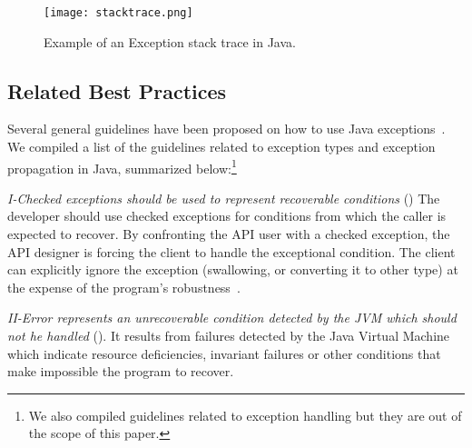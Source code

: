 \documentclass[conference]{IEEEtran}
\begin{document}
\begin{figure} \centering \texttt{[image: stacktrace.png]}
\caption{Example of an Exception stack trace in Java.}
\label{fig:wrapping}
\end{figure}



\subsection{Related Best Practices}
\label{sec:best}

Several general guidelines have been proposed on how to use Java
exceptions~\cite{mandrioli1992advances,gosling2000java,wirfs2006toward,
bloch2008effective}. 
We compiled a list of the guidelines related to exception types and exception propagation in Java, summarized below:\footnote{We also compiled guidelines related
to exception handling but they are out of the scope of this paper.}


\emph{I-Checked exceptions should be used to represent recoverable
conditions} (\cite{mandrioli1992advances,gosling2000java,wirfs2006toward,bloch2008effective})
The developer should use checked exceptions for conditions from which the caller
is expected to recover. By confronting the API user with a checked exception,
the API designer is forcing the client to handle the exceptional condition. The
client can explicitly ignore the exception (swallowing, or converting it to
other type) at the expense of the program's robustness~\cite{gosling2000java}.

\emph{II-Error represents an unrecoverable condition detected by the JVM which
should not he handled} (\cite{gosling2000java}). It results from failures detected
by the Java Virtual Machine which indicate resource deficiencies, invariant
failures or other conditions that make impossible the program to recover.
\end{document}
